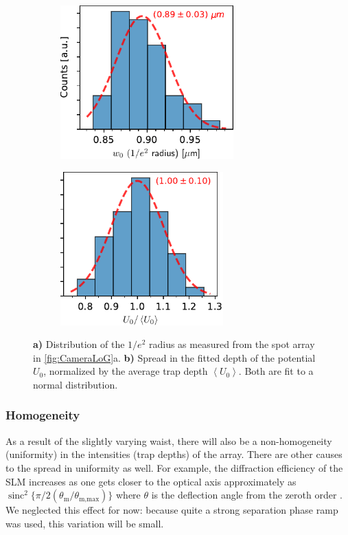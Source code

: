 \begin{figure}
	\begin{subfigure}{.49\linewidth}
		\centering
		\includegraphics[height=5.9cm]{figures/WaistHistogram.pdf}
		\caption{}
		\label{fig:WaistHistogram}
	\end{subfigure}
	\hfill
	\begin{subfigure}{.49\linewidth}
		\centering
		\includegraphics[height=5.9cm]{figures/DepthHistogram.pdf}
		\caption{}
		\label{fig:DepthHistogram}
	\end{subfigure}
	\caption{
	\textsf{\textbf{a)}} Distribution of the $1/e^2$ radius as measured from the spot array in \cref{fig:CameraLoG}a.
   \textsf{\textbf{b)}} Spread in the fitted depth of the potential $U_0$, normalized by the     average trap depth $\left\langle U_0 \right\rangle$.
    Both are fit to a normal distribution.
    }
\end{figure}


\subsubsection*{Homogeneity}

As a result of the slightly varying waist, there will also be a non-homogeneity (uniformity) in the intensities (trap depths) of the array.
There are other causes to the spread in uniformity as well.
For example, the diffraction efficiency of the SLM increases as one gets closer to the optical axis approximately as $\operatorname{sinc}^2\{
\pi/2 (\theta_{\text{m}}/\theta_{\text{m,max}})\}$ where $\theta$ is the deflection angle from the zeroth order \cite{Ebadi2021}.
We neglected this effect for now: because quite a strong separation phase ramp was used, this variation will be small.


